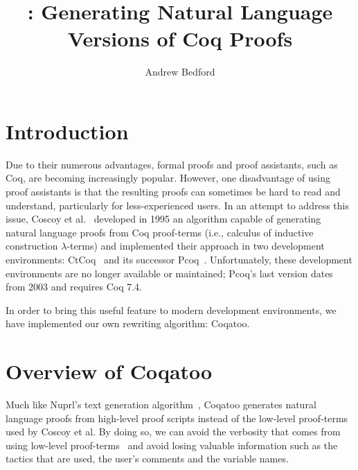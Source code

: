 \documentclass[sigplan,screen,9pt]{acmart}
\begin{document}
\title[Coqatoo]{\coqatoo: Generating Natural Language Versions of Coq Proofs}


\author{Andrew Bedford}



\maketitle

\section{Introduction}
Due to their numerous advantages, formal proofs and proof assistants, such as Coq, are becoming increasingly popular. However, one disadvantage of using proof assistants is that the resulting proofs can sometimes be hard to read and understand, particularly for less-experienced users. In an attempt to address this issue, Coscoy et al.~\cite{DBLP:conf/tlca/CoscoyKT95} developed in 1995 an algorithm capable of generating natural language proofs from Coq proof-terms (i.e., calculus of inductive construction $\lambda$-terms) and implemented their approach in two development environments: CtCoq~\cite{CtCoq,bertot1999ctcoq} and its successor Pcoq~\cite{Pcoq,amerkad2001mathematics}. Unfortunately, these development environments are no longer available or maintained; Pcoq's last version dates from 2003 and requires Coq 7.4.

In order to bring this useful feature to modern development environments, we have implemented our own rewriting algorithm: Coqatoo.


\section{Overview of Coqatoo}
Much like Nuprl's text generation algorithm~\cite{DBLP:conf/aaai/Holland-MinkleyBC99}, Coqatoo generates natural language proofs from high-level proof scripts instead of the low-level proof-terms used by Coscoy et al. By doing so, we can avoid the verbosity that comes from using low-level proof-terms~\cite{DBLP:conf/lacl/Coscoy96} and avoid losing valuable information such as the tactics that are used, the user's comments and the variable names. 
\end{document}
